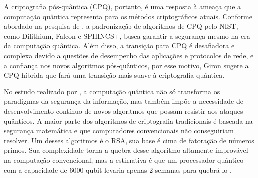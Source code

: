 {	A criptografia pós-quântica (CPQ), portanto, é uma resposta à ameaça que a computação quântica representa para os métodos criptográficos atuais. Conforme abordado na pesquisa de \citeauthor{giron2023}, a padronização de algoritmos de CPQ pelo NIST, como Dilithium, Falcon e SPHINCS+, busca garantir a segurança mesmo na era da computação quântica. Além disso, a transição para CPQ é desafiadora e complexa devido a questões de desempenho das aplicações e protocolos de rede, e a confiança nos novos algoritmos pós-quânticos, por esse motivo, Giron sugere a CPQ híbrida que fará uma transição mais suave à criptografia quântica.
	
	No estudo realizado por \citeauthor{augusto2022}, a computação quântica não só transforma os paradigmas da segurança da informação, mas também impõe a necessidade de desenvolvimento contínuo de novos algoritmos que possam resistir aos ataques quânticos. A maior parte dos algoritmos de criptografia tradicionais é baseada na segurança matemática e que computadores convencionais não conseguiriam resolver. Um desses algoritmos é o RSA, sua base é cima de fatoração de números primos. Sua complexidade torna a quebra desse algoritmo altamente improvável na computação convencional, mas a estimativa é que um processador quântico com a capacidade de 6000 qubit levaria apenas 2 semanas para quebrá-lo \cite{augusto2022}.
	


}
